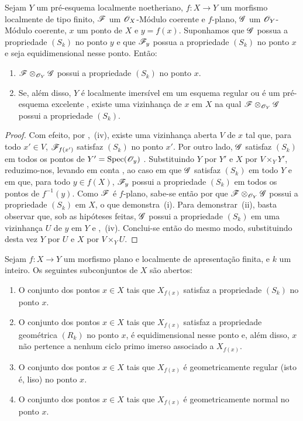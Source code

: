 \begin{corollary}[12.1.5]
\label{IV.12.1.5}
Sejam $Y$ um pré-esquema localmente noetheriano,
$f:X\to Y$ um morfismo localmente de tipo finito,
$\mathscr{F}$ um $\mathscr{O}_X$-Módulo coerente e $f$-plano,
$\mathscr{G}$ um $\mathscr{O}_Y$-Módulo coerente, $x$ um ponto
de $X$ e $y=f(x)$. Suponhamos que $\mathscr{G}$ possua
a propriedade $(S_k)$ no ponto $y$ e que
$\mathscr{F}_y$ possua a propriedade $(S_k)$ no ponto
$x$ e seja equidimensional nesse ponto. Então:
\begin{enumerate}[label=(\roman*)]
\item $\mathscr{F}\otimes_{\mathscr{O}_Y}\mathscr{G}$ possui a
propriedade $(S_k)$ no ponto $x$.
\item Se, além disso, $Y$ é localmente imersível em
um esquema regular ou é um pré-esquema excelente
, existe uma vizinhança de $x$ em
$X$ na qual
$\mathscr{F}\otimes_{\mathscr{O}_Y}\mathscr{G}$ possui a
propriedade $(S_k)$.
\end{enumerate}
\end{corollary}

\begin{proof}
Com efeito, por ,~(iv), existe uma
vizinhança aberta $V$ de $x$ tal que, para todo
$x'\in V$, $\mathscr{F}_{f(x')}$ satisfaz $(S_k)$ no
ponto $x'$. Por outro lado, $\mathscr{G}$ satisfaz
$(S_k)$ em todos os pontos de
$Y'=\operatorname{Spec}(\mathscr{O}_y)$
. Substituindo $Y$ por $Y'$ e
$X$ por $V\times_Y Y'$, reduzimo-nos, levando
em conta , ao caso em que
$\mathscr{G}$ satisfaz $(S_k)$ em todo $Y$ e em que,
para todo $y\in f(X)$, $\mathscr{F}_y$ possui a
propriedade $(S_k)$ em todos os pontos de
$f^{-1}(y)$. Como $\mathscr{F}$ é $f$-plano,
sabe-se então por  que
$\mathscr{F}\otimes_{\mathscr{O}_Y}\mathscr{G}$ possui a
propriedade $(S_k)$ em $X$, o que demonstra~(i).
Para demonstrar~(ii), basta observar que, sob as
hipóteses feitas, $\mathscr{G}$ possui a
propriedade $(S_k)$ em uma vizinhança $U$ de $y$
em $Y$  e
,~(iv). Conclui-se então do mesmo
modo, substituindo desta vez $Y$ por $U$ e $X$
por $V\times_Y U$.
\end{proof}

\begin{theorem}[12.1.6]
\label{IV.12.1.6}
Sejam $f:X\to Y$ um morfismo plano e localmente de
apresentação finita, e $k$ um inteiro. Os seguintes
subconjuntos de $X$ são abertos:
\begin{enumerate}[label=(\roman*)]
\item O conjunto dos pontos $x\in X$ tais que
$X_{f(x)}$ satisfaz a propriedade $(S_k)$ no ponto
$x$.
\item O conjunto dos pontos $x\in X$ tais que
$X_{f(x)}$ satisfaz a propriedade geométrica
$(R_k)$ no ponto $x$, é equidimensional nesse ponto
e, além disso, $x$ não pertence a nenhum ciclo
primo imerso associado a $X_{f(x)}$.
\item O conjunto dos pontos $x\in X$ tais que
$X_{f(x)}$ é geometricamente regular (isto é, liso)
no ponto $x$.
\item O conjunto dos pontos $x\in X$ tais que
$X_{f(x)}$ é geometricamente normal no ponto $x$.
\end{enumerate}
\end{theorem}


